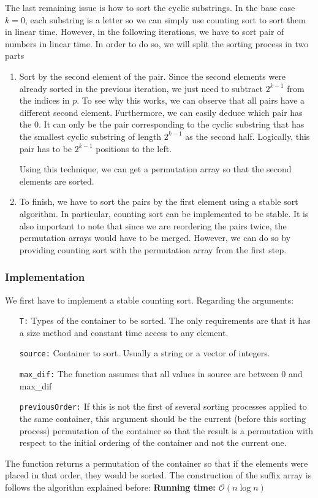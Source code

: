 The last remaining issue is how to sort the cyclic substrings. In the base 
case $k=0$, each substring is a letter so we can simply use counting sort
to sort them in linear time.
However, in the following iterations, we have to sort pair of numbers in 
linear time. In order to do so, we will split the sorting process in two 
parts
\begin{enumerate}
		\item Sort by the second element of the pair. Since the second elements
				were already sorted in the previous iteration, we just need
				to subtract $2^{k-1}$ from the indices in $p$. 
				To see why this works, we can observe that all pairs have a
				different second element. Furthermore, we can easily 
				deduce which pair has the 0. It can only be the pair 
				corresponding to the cyclic substring that has the smallest
				cyclic substring of length $2^{k-1}$ as the second half. 
				Logically, this pair has to be $2^{k-1}$ positions to the 
				left.

				Using this technique, we can get a permutation array so that
				the second elements are sorted.

		\item To finish, we have to sort the pairs by the first element using
				a stable sort algorithm. In particular, counting sort can
				be implemented to be stable. 
				It is also important to note that since we are reordering the
				pairs twice, the permutation arrays would have to be merged.
				However, we can do so by providing counting sort with the 
				permutation array from the first step.
\end{enumerate}
\subsubsection{Implementation}
We first have to implement a stable counting sort. Regarding the arguments:
\begin{itemize}[leftmargin=3cm]
		\item [\texttt{T:}] Types of the container to be sorted. The only 
				requirements are that it has a size method and constant
				time access to any element.
		\item[\texttt{source:}] Container to sort. Usually a string or 
				a vector of integers.
		\item[\texttt{max\_dif:}] The function assumes that all values in 
				source are between 0 and max\_dif
		\item[\texttt{previousOrder:}] If this is not the first of several
				sorting processes applied to the same container, this argument
				should be the current (before this sorting process)
				permutation of the container so that the
				result is a permutation with respect to the initial ordering
				of the container and not the current one.
\end{itemize}
The function returns a permutation of the container so that if the elements
were placed in that order, they would be sorted.
\newpage
The construction of the suffix array is follows the algorithm explained 
before:
\noindent \textbf{\boldmath Running time: $\mathcal{O}(n \log n)$}
\newpage
